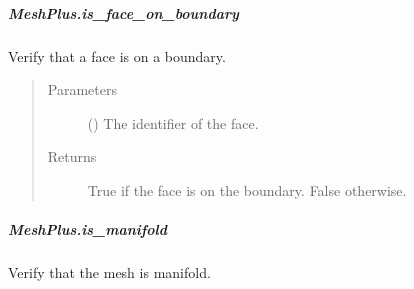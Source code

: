 \documentclass[letterpaper,10pt,english]{sphinxmanual}
\begin{document}
\begin{fulllineitems}
\begin{fulllineitems}
\begin{quote}
\begin{description}
\end{description}\end{quote}

\end{fulllineitems}



\subparagraph{MeshPlus.is\_face\_on\_boundary}
\label{\detokenize{api/generated/directional_clustering.mesh.MeshPlus.is_face_on_boundary:meshplus-is-face-on-boundary}}\label{\detokenize{api/generated/directional_clustering.mesh.MeshPlus.is_face_on_boundary::doc}}

\begin{fulllineitems}
\label{\detokenize{api/generated/directional_clustering.mesh.MeshPlus.is_face_on_boundary:directional_clustering.mesh.MeshPlus.is_face_on_boundary}}
Verify that a face is on a boundary.
\begin{quote}\begin{description}
\item[{Parameters}] \leavevmode
{} () \textendash{} The identifier of the face.

\item[{Returns}] \leavevmode
{} \textendash{} True if the face is on the boundary.
False otherwise.

\end{description}\end{quote}

\end{fulllineitems}



\subparagraph{MeshPlus.is\_manifold}
\label{\detokenize{api/generated/directional_clustering.mesh.MeshPlus.is_manifold:meshplus-is-manifold}}\label{\detokenize{api/generated/directional_clustering.mesh.MeshPlus.is_manifold::doc}}

\begin{fulllineitems}
\label{\detokenize{api/generated/directional_clustering.mesh.MeshPlus.is_manifold:directional_clustering.mesh.MeshPlus.is_manifold}}
Verify that the mesh is manifold.


\end{fulllineitems}
\end{fulllineitems}
\end{document}
